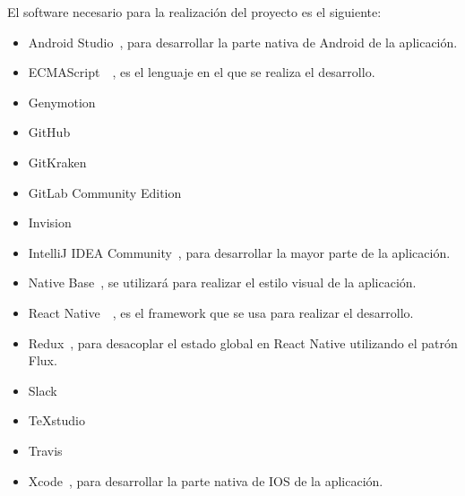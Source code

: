  El software necesario para la realización del proyecto es el siguiente:
\begin{itemize}
	\item Android Studio~\cite{ASTUDIO}, para desarrollar la parte nativa de Android de la aplicación.
	\item ECMAScript~\cite{ECMA}~\cite{ECMABOOK}, es el lenguaje en el que se realiza el desarrollo.
	\item Genymotion
	\item GitHub
	\item GitKraken
	\item GitLab Community Edition
	\item Invision
	\item IntelliJ IDEA Community~\cite{IDEA}, para desarrollar la mayor parte de la aplicación.
	\item Native Base~\cite{NABA}, se utilizará para realizar el estilo visual de la aplicación.
	\item React Native~\cite{RENA}~\cite{REACTBOOK}, es el framework que se usa para realizar el desarrollo.
	\item Redux~\cite{REDUX}, para desacoplar el estado global en React Native utilizando el patrón Flux.
	\item Slack
	\item TeXstudio
	\item Travis
	\item Xcode~\cite{XCODE}, para desarrollar la parte nativa de IOS de la aplicación.
\end{itemize}

